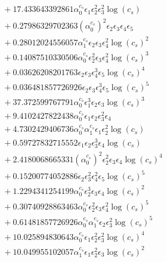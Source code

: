 \documentclass[10pt]{article}
\begin{document}
\begin{align*}
&{}  + 17.433643392861 \alpha_{0}^{c_s} \epsilon_{1} \epsilon_{2}^{2} \epsilon_{3}^{2} \log{\left(c_{s} \right)} \\
&{}  + 0.27986329702363 \left(\alpha_{0}^{c_s}\right)^{2} \epsilon_{2} \epsilon_{3} \epsilon_{4} \epsilon_{5} \\
&{}  + 0.28012024556057 \alpha_{1}^{c_s} \epsilon_{2} \epsilon_{3} \epsilon_{4}^{2} \log{\left(c_{s} \right)}^{2} \\
&{}  + 0.14087510330506 \alpha_{0}^{c_s} \epsilon_{2}^{2} \epsilon_{3} \epsilon_{4}^{2} \log{\left(c_{s} \right)}^{3} \\
&{}  + 0.03626208201763 \epsilon_{2} \epsilon_{3} \epsilon_{4}^{3} \epsilon_{5} \log{\left(c_{s} \right)}^{4} \\
&{}  + 0.036481857726926 \epsilon_{2} \epsilon_{3} \epsilon_{4}^{3} \epsilon_{5} \log{\left(c_{s} \right)}^{5} \\
&{}  + 37.372599767791 \alpha_{0}^{c_s} \epsilon_{1}^{3} \epsilon_{2} \epsilon_{3} \log{\left(c_{s} \right)}^{3} \\
&{}  + 9.4102427822438 \alpha_{0}^{c_s} \epsilon_{1} \epsilon_{2} \epsilon_{3}^{2} \epsilon_{4} \\
&{}  + 4.7302429406736 \alpha_{0}^{c_s} \alpha_{1}^{c_s} \epsilon_{1} \epsilon_{2}^{2} \log{\left(c_{s} \right)} \\
&{}  + 0.59727832715552 \epsilon_{1} \epsilon_{2} \epsilon_{3}^{3} \epsilon_{4} \log{\left(c_{s} \right)} \\
&{}  + 2.4180068665331 \left(\alpha_{0}^{c_s}\right)^{2} \epsilon_{2}^{2} \epsilon_{3} \epsilon_{4} \log{\left(c_{s} \right)}^{4} \\
&{}  + 0.15200774052886 \epsilon_{2} \epsilon_{3}^{2} \epsilon_{4}^{2} \epsilon_{5} \log{\left(c_{s} \right)}^{5} \\
&{}  + 1.2294341254199 \alpha_{0}^{c_s} \epsilon_{2}^{3} \epsilon_{3} \epsilon_{4} \log{\left(c_{s} \right)}^{2} \\
&{}  + 0.30740928863463 \alpha_{0}^{c_s} \epsilon_{2}^{2} \epsilon_{3} \epsilon_{4}^{2} \log{\left(c_{s} \right)}^{5} \\
&{}  + 0.61481857726926 \alpha_{0}^{c_s} \alpha_{1}^{c_s} \epsilon_{2} \epsilon_{3}^{2} \log{\left(c_{s} \right)}^{5} \\
&{}  + 10.025894830643 \alpha_{0}^{c_s} \epsilon_{1} \epsilon_{2}^{2} \epsilon_{3}^{2} \log{\left(c_{s} \right)}^{4} \\
&{}  + 10.049955102057 \alpha_{1}^{c_s} \epsilon_{1} \epsilon_{2}^{2} \epsilon_{3} \log{\left(c_{s} \right)}^{2} \\

\end{align*}
\end{document}
